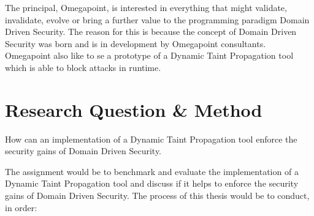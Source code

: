 \documentclass{../kththesis}
\begin{document}
The principal, Omegapoint, is interested in everything that might validate, invalidate, evolve or bring a further value to the programming paradigm Domain Driven Security. The reason for this is because the concept of Domain Driven Security was born and is in development by Omegapoint consultants. Omegapoint also like to se a prototype of a Dynamic Taint Propagation tool which is able to block attacks in runtime.



\chapter{Research Question \& Method} \label{ResearchQuestionMethod}
\begin{chapquote}{}
	How can an implementation of a Dynamic Taint Propagation tool enforce the security gains of Domain Driven Security.
\end{chapquote}

\noindent
The assignment would be to benchmark and evaluate the implementation of a Dynamic Taint Propagation tool and discuss if it helps to enforce the security gains of Domain Driven Security. The process of this thesis would be to conduct, in order:
\end{document}
